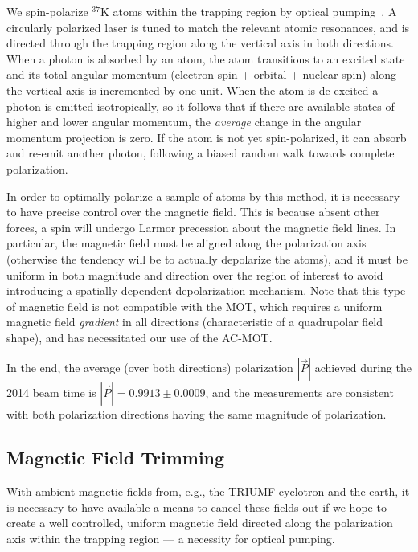 We spin-polarize $^{37}\textrm{K}$ atoms within the trapping region by optical pumping~\cite{ben_OP}.  A circularly polarized laser is tuned to match the relevant atomic resonances, and is directed through the trapping region along the vertical axis in both directions.  When a photon is absorbed by an atom, the atom transitions to an excited state and its total angular momentum (electron spin + orbital + nuclear spin) along the vertical axis is incremented by one unit.  When the atom is de-excited a photon is emitted isotropically, 
so it follows that if there are available states of higher and lower angular momentum, the \emph{average} change in the angular momentum projection is zero.  If the atom is not yet spin-polarized, it can absorb and re-emit another photon, following a biased random walk towards complete polarization.  

In order to optimally polarize a sample of atoms by this method, it is necessary to have precise control over the magnetic field.  This is because absent other forces, a spin will undergo Larmor precession about the magnetic field lines.  In particular, the magnetic field must be aligned along the polarization axis (otherwise the tendency will be to actually depolarize the atoms), and it must be uniform in both magnitude and direction over the region of interest to avoid introducing a spatially-dependent depolarization mechanism.  
Note that this type of magnetic field is not compatible with the MOT, which requires a uniform magnetic field \emph{gradient} in all directions (characteristic of a quadrupolar field shape), and has necessitated our use of the AC-MOT.

In the end, the average (over both directions) polarization $|\vec{P}|$ achieved during the 2014 beam time is $|\vec{P}| = 0.9913 \pm 0.0009$, and the measurements are consistent with both polarization directions having the same magnitude of polarization\cite{ben_OP}.

\note[note]{}



\FloatBarrier
\subsection{Magnetic Field Trimming}
\label{sec:trimming}
With ambient magnetic fields from, e.g., the TRIUMF cyclotron and the earth, it is necessary to have available a means to cancel these fields out if we hope to create a well controlled, uniform magnetic field directed along the polarization axis within the trapping region --- a necessity for optical pumping.  

